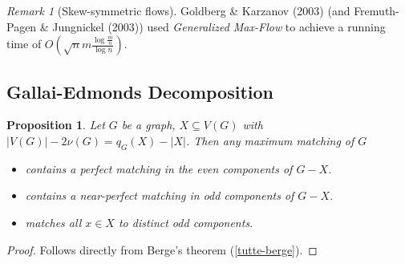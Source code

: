 \documentclass[11pt, a4paper]{article}
\newcommand{\abs}[1]{\left\lvert#1\right\rvert}
\newtheorem{prop}[theorem]{Proposition}
\theoremstyle{remark}
\newtheorem{remark}[theorem]{Remark}
\theoremstyle{definition}
\begin{document}
\begin{remark}[Skew-symmetric flows]
Goldberg \& Karzanov (2003) (and Fremuth-Pagen \& Jungnickel (2003))
used \emph{Generalized Max-Flow} to achieve a running time of
$O(\sqrt{n}m\frac{\log\frac{m}{n}}{\log n})$.
\end{remark}


\subsection{Gallai-Edmonds Decomposition}

\begin{prop}\label{prop:gallai-edmonds}
Let $G$ be a graph, $X\subseteq V(G)$ with $\abs{V(G)}-2\nu(G)=q_G(X)
-\abs{X}$. Then any maximum matching of $G$
\begin{itemize}
	\item contains a perfect matching in the even components of $G-X$.
	\item contains a near-perfect matching in odd components of $G-X$.
	\item matches all $x\in X$ to distinct odd components.
\end{itemize}
\end{prop}
\begin{proof}
Follows directly from Berge's theorem (\ref{tutte-berge}).
\end{proof}
\end{document}
